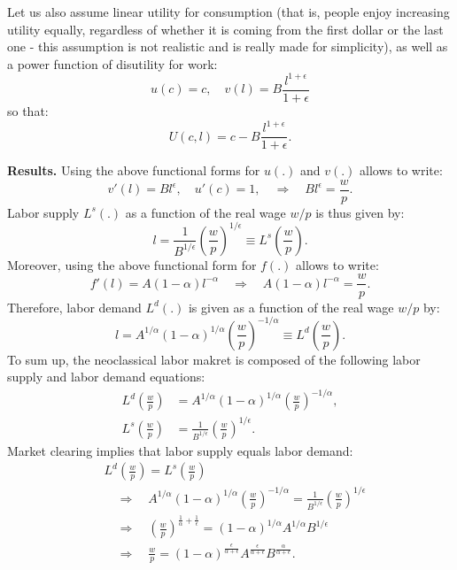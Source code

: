 \documentclass[]{book}
\begin{document}
Let us also assume linear utility for consumption (that is, people enjoy
increasing utility equally, regardless of whether it is coming from the
first dollar or the last one - this assumption is not realistic and is
really made for simplicity), as well as a power function of disutility
for work: \[u(c)=c, \quad v(l)=B\frac{l^{1+\epsilon}}{1+\epsilon}\] so
that: \[U(c, l)=c-B\frac{l^{1+\epsilon}}{1+\epsilon}.\]

\textbf{Results.} Using the above functional forms for \(u(.)\) and
\(v(.)\) allows to write:
\[v'(l)=Bl^{\epsilon}, \quad u'(c)=1, \quad \Rightarrow \quad Bl^{\epsilon} = \frac{w}{p}.\]
Labor supply \(L^{s}(.)\) as a function of the real wage \(w/p\) is thus
given by:
\[l =\frac{1}{B^{1/\epsilon}} \left(\frac{w}{p}\right)^{1/\epsilon} \equiv L^s\left(\frac{w}{p}\right).\]
Moreover, using the above functional form for \(f(.)\) allows to write:
\[f'(l) =A(1-\alpha)l^{-\alpha} \quad \Rightarrow \quad A(1-\alpha)l^{-\alpha}=\frac{w}{p}.\]
Therefore, labor demand \(L^d(.)\) is given as a function of the real
wage \(w/p\) by:
\[l=A^{1/\alpha}(1-\alpha)^{1/\alpha}\left(\frac{w}{p}\right)^{-1/\alpha}\equiv L^d\left(\frac{w}{p}\right).\]
To sum up, the neoclassical labor makret is composed of the following
labor supply and labor demand equations: \[
\begin{aligned}
L^d\left(\frac{w}{p}\right) &= A^{1/\alpha}(1-\alpha)^{1/\alpha}\left(\frac{w}{p}\right)^{-1/\alpha},\\
L^s\left(\frac{w}{p}\right) &= \frac{1}{B^{1/\epsilon}} \left(\frac{w}{p}\right)^{1/\epsilon}.
\end{aligned}
\] Market clearing implies that labor supply equals labor demand: \[
\begin{aligned}
&L^d\left(\frac{w}{p}\right) = L^s\left(\frac{w}{p}\right) \\
&\quad \Rightarrow \quad A^{1/\alpha}(1-\alpha)^{1/\alpha}\left(\frac{w}{p}\right)^{-1/\alpha} = \frac{1}{B^{1/\epsilon}} \left(\frac{w}{p}\right)^{1/\epsilon} \\
&\quad \Rightarrow \quad \left(\frac{w}{p}\right)^{\frac{1}{\alpha} +\frac{1}{\epsilon}}= (1-\alpha)^{1/\alpha}A^{1/\alpha} B^{1/\epsilon}\\
& \quad \Rightarrow \quad \frac{w}{p} = (1-\alpha)^{\frac{\epsilon}{\alpha+\epsilon}}A^{\frac{\epsilon}{\alpha+\epsilon}} B^{\frac{\alpha}{\alpha+\epsilon}}.
\end{aligned}
\]
\end{document}
